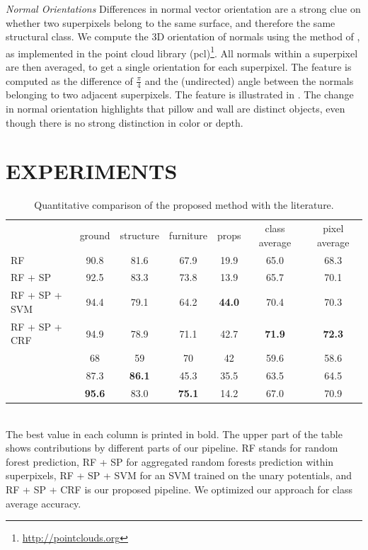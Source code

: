 \documentclass[a4paper, 10pt, conference]{ieeeconf}      %
\begin{document}
\emph{Normal Orientations}
    Differences in normal vector orientation are a strong clue on
    whether two superpixels belong to the same surface, and therefore the
    same structural class.
    We compute the 3D orientation of normals using the method of \citet{holz_2011_robocup},
    as implemented in the point cloud library (pcl)\footnote{\url{http://pointclouds.org}}.
    All normals within a superpixel are then averaged, to get a single orientation for each superpixel.
    The feature is computed as the difference of $\frac{\pi}{4}$ and the (undirected) angle between the normals belonging
    to two adjacent superpixels.  
    The feature is illustrated in . The change
    in normal orientation highlights that pillow and wall are distinct
    objects, even though there is no strong distinction in color or depth.


\section{EXPERIMENTS}

\begin{table}[t]
    \caption{Quantitative comparison of the proposed method with the
    literature.}
\begin{tabularx}{\linewidth}{@{\extracolsep{\fill}}lcccccc}
\toprule
                        & ground        &  structure    & furniture     & props         & class average   & pixel average\\
\cmidrule(r){1-7}

RF                      &         90.8  &   81.6        & 67.9          & 19.9          &  65.0        &  68.3 \\
RF + SP                 &         92.5  &   83.3        & 73.8          & 13.9          &  65.7        &  70.1 \\ 
RF + SP + SVM           &         94.4  &   79.1        & 64.2          & \textbf{44.0} &  70.4        &  70.3 \\
RF + SP + CRF           &         94.9  &   78.9        &          71.1 & 42.7          &\textbf{71.9} &  \textbf{72.3} \\
\cmidrule(r){1-7}
\citet{SilbermanECCV12} &         68    &   59          & 70           & 42            &  59.6        & 58.6 \\
\citet{couprie-iclr-13} &         87.3  & \textbf{86.1} & 45.3         & 35.5          &  63.5        & 64.5 \\
\citet{stueckler2013}   & \textbf{95.6} &   83.0        & \textbf{75.1}& 14.2          &  67.0        & 70.9 \\

\bottomrule
\end{tabularx}
\quad\\The best value in each column is printed in bold. The upper part of
the table shows contributions by different parts of our pipeline. RF stands for random forest prediction, RF + SP for aggregated
random forests prediction within superpixels, RF + SP + SVM for an SVM trained on the unary potentials, and RF + SP + CRF is
our proposed pipeline. We optimized our approach for class average
accuracy.
\end{table}
\end{document}
